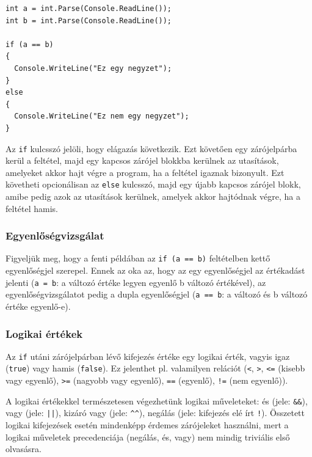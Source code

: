\documentclass[a4paper]{article}
\begin{document}
\begin{lstlisting}[caption=Elágazás, label=lst:if]
int a = int.Parse(Console.ReadLine());
int b = int.Parse(Console.ReadLine());

if (a == b)
{
  Console.WriteLine("Ez egy negyzet");
}
else
{
  Console.WriteLine("Ez nem egy negyzet");
}
\end{lstlisting}

Az \lstinline{if} kulcsszó jelöli, hogy elágazás következik. Ezt követően egy zárójelpárba kerül a feltétel, majd egy kapcsos zárójel blokkba kerülnek az utasítások, amelyeket akkor hajt végre a program, ha a feltétel igaznak bizonyult. Ezt követheti opcionálisan az \lstinline{else} kulcsszó, majd egy újabb kapcsos zárójel blokk, amibe pedig azok az utasítások kerülnek, amelyek akkor hajtódnak végre, ha a feltétel hamis.

\subsubsection{Egyenlőségvizsgálat}
Figyeljük meg, hogy a fenti példában az \lstinline{if (a == b)} feltételben kettő egyenlőségjel szerepel. Ennek az oka az, hogy az egy egyenlőségjel az értékadást jelenti (\lstinline{a = b}: a változó értéke legyen egyenlő b változó értékével), az egyenlőségvizsgálatot pedig a dupla egyenlőségjel (\lstinline{a == b}: a változó és b változó értéke egyenlő-e).

\subsubsection{Logikai értékek}
Az \lstinline{if} utáni zárójelpárban lévő kifejezés értéke egy logikai érték, vagyis igaz (\lstinline{true}) vagy hamis (\lstinline{false}). Ez jelenthet pl. valamilyen relációt (\lstinline{<}, \lstinline{>}, \lstinline{<=} (kisebb vagy egyenlő), \lstinline{>=} (nagyobb vagy egyenlő), \lstinline{==} (egyenlő), \lstinline{!=} (nem egyenlő)).

A logikai értékekkel természetesen végezhetünk logikai műveleteket: és (jele: \lstinline{&&}), vagy (jele: \lstinline{||}), kizáró vagy (jele: \lstinline{^^}), negálás (jele: kifejezés elé írt \lstinline{!}). Összetett logikai kifejezések esetén mindenképp érdemes zárójeleket használni, mert a logikai műveletek precedenciája (negálás, és, vagy) nem mindig triviális első olvasásra.
\end{document}
